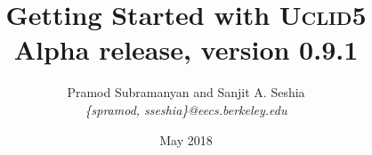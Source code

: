 \documentclass[oneside]{scrbook}
\newcommand{\uclid}{{\textsc{Uclid5}}\xspace}
\begin{document}
\title{Getting Started with {\uclid}\\Alpha release, version 0.9.1}
\author{Pramod Subramanyan and Sanjit A. Seshia \\
        \textit{\{spramod, sseshia\}@eecs.berkeley.edu}}
\date{May 2018}
\maketitle

\tableofcontents
\listofuclidlisting









\appendix

\end{document}

